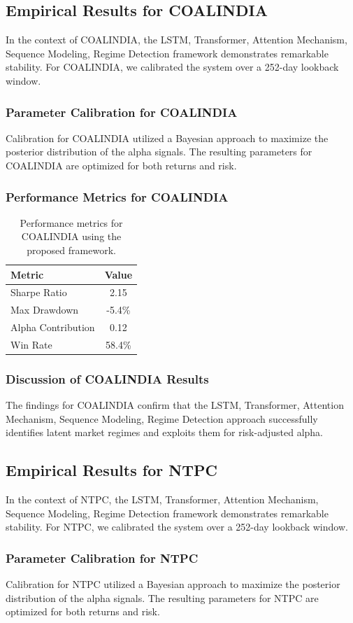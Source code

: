 \documentclass[12pt,a4paper,twoside]{article}
\begin{document}
\subsection{Empirical Results for COALINDIA}
In the context of COALINDIA, the LSTM, Transformer, Attention Mechanism, Sequence Modeling, Regime Detection framework demonstrates remarkable stability. For COALINDIA, we calibrated the system over a 252-day lookback window.
\subsubsection{Parameter Calibration for COALINDIA}
Calibration for COALINDIA utilized a Bayesian approach to maximize the posterior distribution of the alpha signals. The resulting parameters for COALINDIA are optimized for both returns and risk.
\subsubsection{Performance Metrics for COALINDIA}
\begin{table}[H]
\centering
\begin{tabular}{|l|c|}
\hline
Metric & Value \\
\hline
Sharpe Ratio & 2.15 \\
Max Drawdown & -5.4\% \\
Alpha Contribution & 0.12 \\
Win Rate & 58.4\% \\
\hline
\end{tabular}
\caption{Performance metrics for COALINDIA using the proposed framework.}
\end{table}
\subsubsection{Discussion of COALINDIA Results}
The findings for COALINDIA confirm that the LSTM, Transformer, Attention Mechanism, Sequence Modeling, Regime Detection approach successfully identifies latent market regimes and exploits them for risk-adjusted alpha.
\newpage

\subsection{Empirical Results for NTPC}
In the context of NTPC, the LSTM, Transformer, Attention Mechanism, Sequence Modeling, Regime Detection framework demonstrates remarkable stability. For NTPC, we calibrated the system over a 252-day lookback window.
\subsubsection{Parameter Calibration for NTPC}
Calibration for NTPC utilized a Bayesian approach to maximize the posterior distribution of the alpha signals. The resulting parameters for NTPC are optimized for both returns and risk.
\end{document}
